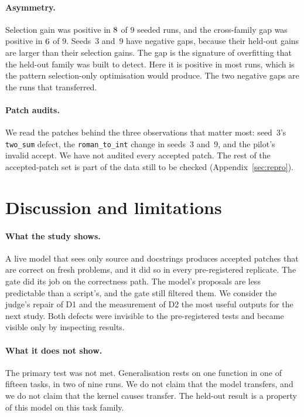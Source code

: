 \documentclass[11pt]{article}
\begin{document}
\paragraph{Asymmetry.} Selection gain was positive in $8$ of $9$ seeded runs, and the cross-family gap was positive in $6$ of $9$. Seeds~3 and~9 have negative gaps, because their held-out gains are larger than their selection gains. The gap is the signature of overfitting that the held-out family was built to detect. Here it is positive in most runs, which is the pattern selection-only optimisation would produce. The two negative gaps are the runs that transferred.

\paragraph{Patch audits.} We read the patches behind the three observations that matter most: seed~3's \texttt{two\_sum} defect, the \texttt{roman\_to\_int} change in seeds~3 and~9, and the pilot's invalid accept. We have not audited every accepted patch. The rest of the accepted-patch set is part of the data still to be checked (Appendix~\ref{sec:repro}).

\section{Discussion and limitations}

\paragraph{What the study shows.} A live model that sees only source and docstrings produces accepted patches that are correct on fresh problems, and it did so in every pre-registered replicate. The gate did its job on the correctness path. The model's proposals are less predictable than a script's, and the gate still filtered them. We consider the judge's repair of D1 and the measurement of D2 the most useful outputs for the next study. Both defects were invisible to the pre-registered tests and became visible only by inspecting results.

\paragraph{What it does not show.} The primary test was not met. Generalisation rests on one function in one of fifteen tasks, in two of nine runs. We do not claim that the model transfers, and we do not claim that the kernel causes transfer. The held-out result is a property of this model on this task family.
\end{document}
